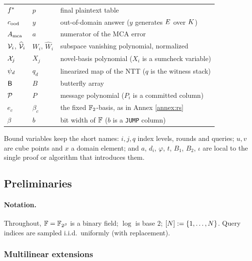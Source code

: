 \begin{center}
\begin{tabular}{@{}lll@{}}
$f^{\ast}$      & $p$          & final plaintext table\\
$c_{\mathrm{ood}}$        & $y$          & out-of-domain answer ($y$ generates $E$ over $K$)\\
$A_{\mathrm{mca}}$      & $a$          & numerator of the MCA error\\
$\mathcal{V}_i$, $\widehat{\mathcal{V}}_{i}$ & $W_i$, $\widehat W_i$ & subspace vanishing polynomial, normalized\\
$\mathcal{X}_j$     & $X_j$        & novel-basis polynomial ($X_i$ is a sumcheck variable)\\
$\psi_d$     & $q_d$        & linearized map of the NTT ($q$ is the witness stack)\\
$\mathsf{B}$       & $B$          & butterfly array\\
$\mathcal{P}$       & $P$          & message polynomial ($P_i$ is a committed column)\\
$e_c$          & $\beta_c$    & the fixed $\mathbb{F}_2$-basis, as in Annex \ref{annex:rs}\\
$\beta$        & $b$          & bit width of $\mathbb{F}$ ($b$ is a \texttt{JUMP} column)\\
\hline
\end{tabular}
\end{center}

\noindent Bound variables keep the short names: $i,j,q$ index levels, rounds and queries; $u,v$ are cube points and $x$ a domain element; and $a$, $d_i$, $\varphi$, $t$, $B_1$, $B_2$, $\iota$ are local to the single proof or algorithm that introduces them.

\subsection{Preliminaries}\label{sec:prelims}

\paragraph{Notation.}
Throughout, $\mathbb{F} = \mathbb{F}_{2^{\beta}}$ is a binary field; $\log$ is base $2$; $[N] := \{1,\dots,N\}$. Query indices are sampled i.i.d.\ uniformly (with replacement).

\subsubsection{Multilinear extensions}

